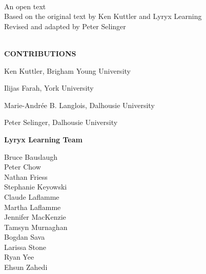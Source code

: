 \thispagestyle{plain}

\begin{center}
  {\fontsize{24pt}{22pt}\selectfont \textcolor{titletextcolour}{\booksubtitle\;\booktitle}} \\
  \bigskip
  {\fontsize{18pt}{20pt}\selectfont An open text} \\
  \bigskip
  {\fontsize{16pt}{20pt}\selectfont Based on the original text by Ken Kuttler and Lyryx Learning} \\
  \smallskip
  {\fontsize{16pt}{20pt}\selectfont Revised and adapted by Peter Selinger} \\
  \bigskip
  {\fontsize{16pt}{20pt}\selectfont \edition} \\
\end{center}

\setlength{\parskip}{0pt}

\vfill

\begin{center}
\fontsize{14pt}{16pt}\selectfont\textcolor{titletextcolour}{\textbf{CONTRIBUTIONS}}
\end{center}

{\small

\begin{center}
Ken Kuttler, Brigham Young University
\bigskip

Ilijas Farah, York University
\smallskip

Marie-Andr\'ee B. Langlois, Dalhousie University
\smallskip

Peter Selinger, Dalhousie University

\bigskip
\textbf{Lyryx Learning Team}
\vspace{-1em}

\begin{multicols}{2}
Bruce Bauslaugh \\
Peter Chow \\
Nathan Friess \\
Stephanie Keyowski \\
Claude Laflamme \\
Martha Laflamme \\
Jennifer MacKenzie \\
Tamsyn Murnaghan \\
Bogdan Sava \\
Larissa Stone \\
Ryan Yee\\
Ehsun Zahedi\\
\end{multicols}

\end{center}

}

